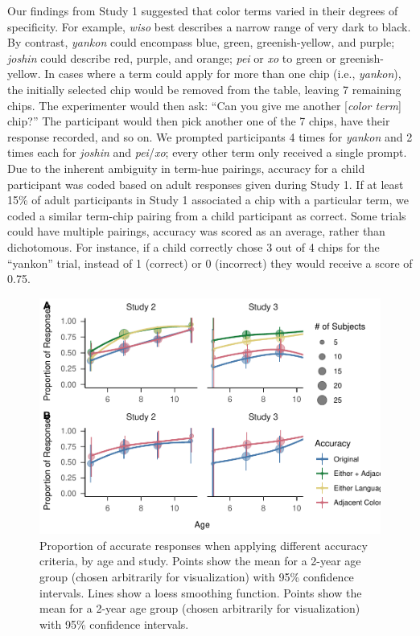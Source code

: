 \documentclass[
  english,
  ,man,floatsintext]{apa6}
\begin{document}
Our findings from Study 1 suggested that color terms varied in their degrees of specificity. For example, \emph{wiso} best describes a narrow range of very dark to black. By contrast, \emph{yankon} could encompass blue, green, greenish-yellow, and purple; \emph{joshin} could describe red, purple, and orange; \emph{pei} or \emph{xo} to green or greenish-yellow. In cases where a term could apply for more than one chip (i.e., \emph{yankon}), the initially selected chip would be removed from the table, leaving 7 remaining chips. The experimenter would then ask: \enquote{Can you give me another {[}\emph{color term}{]} chip?} The participant would then pick another one of the 7 chips, have their response recorded, and so on. We prompted participants 4 times for \emph{yankon} and 2 times each for \emph{joshin} and \emph{pei}/\emph{xo}; every other term only received a single prompt. Due to the inherent ambiguity in term-hue pairings, accuracy for a child participant was coded based on adult responses given during Study 1. If at least 15\% of adult participants in Study 1 associated a chip with a particular term, we coded a similar term-chip pairing from a child participant as correct. Some trials could have multiple pairings, accuracy was scored as an average, rather than dichotomous. For instance, if a child correctly chose 3 out of 4 chips for the \enquote{yankon} trial, instead of 1 (correct) or 0 (incorrect) they would receive a score of 0.75.

\begin{figure}
\centering
\includegraphics{amazon_color_files/figure-latex/study23-accuracy-1.pdf}
\caption{\label{fig:study23-accuracy}Proportion of accurate responses when applying different accuracy criteria, by age and study. Points show the mean for a 2-year age group (chosen arbitrarily for visualization) with 95\% confidence intervals. Lines show a loess smoothing function. Points show the mean for a 2-year age group (chosen arbitrarily for visualization) with 95\% confidence intervals.}
\end{figure}
\end{document}
